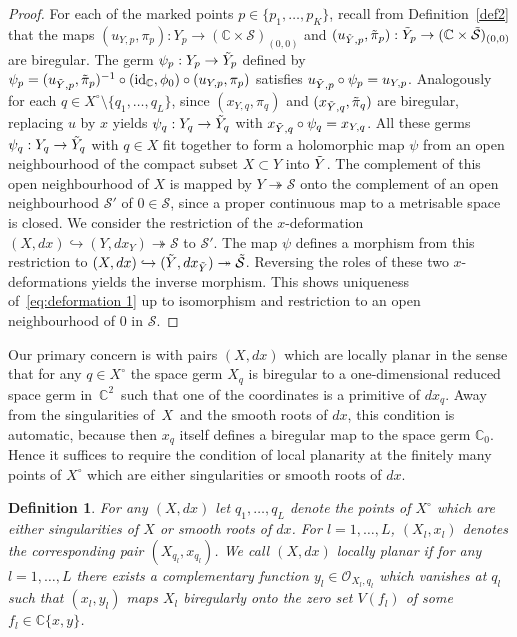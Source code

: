 \documentclass[11pt,twoside]{amsart}
\theoremstyle{plain}
\newtheorem{Definition}[theorem]{Definition}
\newcommand{\C}{\mathbb{C}}
\newcommand{\Sm}{\mathcal{S}}
\newcommand{\Sh}[1]{\mathcal{#1}} %
\DeclareMathOperator{\id}{id}
\newcommand{\dfx}{dx}
\begin{document}
\begin {proof}
For each of the marked points $p\in\{p_1,\ldots,p_K\}$, recall from Definition~\ref{def2} that  the maps $ (u_{Y, p},\pi_p): Y_p \rightarrow (\C\times\Sm)_{(0, 0)} $ and $ (u_{\Tilde{Y},p},\tilde{\pi}_p): \Tilde{Y}_p \rightarrow (\C\times\Tilde{\Sm})_{(0, 0)} $ are biregular. The germ $\psi_p:Y_p\to \Tilde{Y}_p$ defined by $\psi_p = (u_{\Tilde{Y},p},\tilde{\pi}_p)^ {- 1}\circ (\id_\C,\phi_0)\circ (u_{Y, p},\pi_p) $ satisfies $u_{\Tilde{Y},p}\circ\psi_p=u_{Y,p}$. Analogously for each $q\in X^\circ\setminus\{q_1,\ldots,q_L\}$, since $(x_{Y, q},\pi_q)$ and $(x_{\Tilde{Y}, q},\tilde{\pi}_q)$ are biregular, replacing $u$ by $x$ yields $\psi_q:Y_q\to \Tilde{Y}_q$ with $x_{\Tilde{Y},q}\circ\psi_q=x_{Y,q}$. All these germs $\psi_q:Y_q\to \Tilde{Y}_q$ with $q\in X$ fit together to form a holomorphic map $\psi$ from an open neighbourhood of the compact subset $X\subset Y$ into $\Tilde{Y}$. The complement of this open neighbourhood of $X$ is mapped by $Y\twoheadrightarrow\Sm$ onto the complement of an open neighbourhood $\Sm'$ of $0\in\Sm$, since a proper continuous map to a metrisable space is closed. We consider the restriction of the $x$-deformation $(X,\dfx)\hookrightarrow(Y,\dfx_Y)\twoheadrightarrow\Sm$ to $\Sm'$. The map $\psi$ defines a morphism from this restriction to  $(X,\dfx)\hookrightarrow(\Tilde{Y},\dfx_{\Tilde{Y}})\twoheadrightarrow\Tilde{\Sm}$. Reversing the roles of these two $ x $-deformations yields the inverse morphism. This shows uniqueness of~\eqref{eq:deformation 1} up to isomorphism and restriction to an open neighbourhood of $0$ in $\Sm$.\end{proof}

Our primary concern is with pairs $(X,\dfx)$ which are locally planar in the sense that for any $q\in X^\circ$ the space germ $X_q$ is biregular to a one-dimensional reduced space germ in  \,$\mathbb{C}^2$\, such that one of the coordinates is a primitive of $\dfx_q$. Away from the singularities of \,$X$\, and the smooth roots of $dx$, this condition is automatic, because then $x_q$ itself defines a biregular map to the space germ $\mathbb{C}_0$. Hence it suffices to require the condition of local planarity at the finitely many points of $X^\circ$ which are either singularities or smooth roots of $\dfx$.

\begin{Definition}\label{def:locally planar}
	For any $(X,\dfx)$ let $q_1,\ldots,q_L$ denote the points of $X^\circ$ which are either singularities of $X$ or smooth roots of $\dfx$. For $l=1,\ldots,L$, $(X_l,x_l)$ denotes the corresponding pair $(X_{q_l},x_{q_l})$. We call $(X,\dfx)$ \emph{locally planar} if for any $l=1,\dots,L$ there exists a \emph{complementary function} $y_l\in\Sh{O}_{X_l,q_l}$ which vanishes at $q_l$ such that $(x_l,y_l)$ maps $X_l$ biregularly onto the zero set $V(f_l)$ of some $f_l\in\mathbb{C}\{x,y\}$.
\end{Definition}
\end{document}
